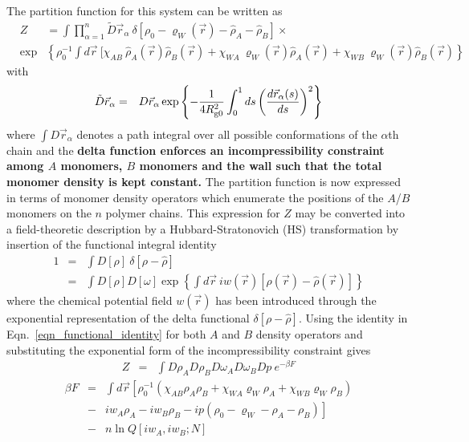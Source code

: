 \documentclass[onecolumn,amsmath,amssymb,floatfix]{elsart}
\begin{document}
The partition function for this system can be written as
%
 \begin{eqnarray}
 \nonumber
 \label{eqn_untransformed_Z}
  & Z & =
      \int \prod^{n}_{\alpha = 1} \tilde{D} {\vec r}_{\alpha} \
      \delta[\rho_0 - \varrho_W ({\vec r}) - {\hat \rho_A} - {\hat \rho_B}] \times \\
  \nonumber
  & \exp &
  \nonumber
  \left \lbrace \rho_0^{-1} \int d{\vec r} \
  [\chi_{AB} \ {\hat \rho_A}({\vec r}) {\hat \rho_B}({\vec r}) +
   \chi_{WA} \    \varrho_W ({\vec r}) {\hat \rho_A}({\vec r}) +
   \chi_{WB} \    \varrho_W ({\vec r}) {\hat \rho_B}({\vec r})
    \right \rbrace
 \end{eqnarray}
%
with
%
 \begin{eqnarray}
  \tilde{D} {\vec r}_{\alpha}
    & = &
    D {\vec r}_{\alpha}
      \exp \left \lbrace
           - \frac{1}{4 R_{{\rm g}0}^2 } \int_0^1
           ds \left ( \frac{ d {\vec r}_{\alpha}(s)}{ds} \right )^{2}
           \right \rbrace
 \end{eqnarray}
where $\int D {\vec r}_\alpha$ denotes a path integral over
all possible conformations of the $\alpha$th chain and the
{\bf
delta function enforces an incompressibility constraint among $A$ monomers,
$B$ monomers and the wall such that the total monomer density is kept
constant.
}
The partition function is now expressed in terms of
monomer density operators which enumerate the positions of the
$A$/$B$ monomers on the $n$ polymer chains.
This expression for
$Z$ may be converted into a field-theoretic description by a
Hubbard-Stratonovich (HS) transformation
by insertion of the functional integral identity
%
 \begin{eqnarray}
 \label{eqn_functional_identity}
  1
  & = &
  \int D[\rho] \ \delta[\rho - {\hat \rho} ] \\
  \nonumber
  & = &
  \int D[\rho] D[\omega]
    \exp
    \left \lbrace
     \int d{\vec r} \ i w({\vec r})
       \left [ \rho({\vec r}) - {\hat \rho}({\vec r}) \right ]
     \right \rbrace
 \end{eqnarray}
%
where the chemical potential field $w({\vec r})$ has been introduced through
the exponential representation of the delta functional
$\delta[\rho - {\hat \rho} ]$.
Using the identity in Eqn.~\ref{eqn_functional_identity} for both $A$ and $B$ density
operators and substituting the exponential form of the incompressibility constraint
gives
%
 \begin{eqnarray}
 \label{eqn_transformed_Z}
 Z
 & = &
  \int D\rho_A D\rho_B D\omega_A D\omega_B Dp
  \ e^{-\beta F}
 \end{eqnarray}
%
%
 \begin{eqnarray}
 \label{eqn_free_energy_1}
 \beta F
 & = &
  \int d{\vec r}
   \left [ \rho_0^{-1}
   (\chi_{AB} \rho_A \rho_B + \chi_{WA} \varrho_W \rho_A + \chi_{WB} \varrho_W \rho_B ) \right . \\
  \nonumber
  & - & i w_A \rho_A - i w_B \rho_B - i p (\rho_0 - \varrho_W - \rho_A - \rho_B) \left . \right ] \\
 \nonumber
  & - & n \ln Q[i w_A,i w_B;N]
 \end{eqnarray}
\end{document}
